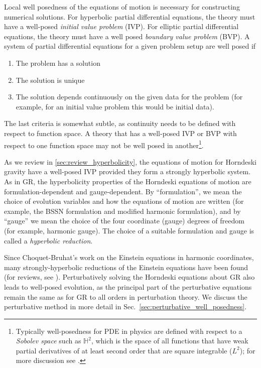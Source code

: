 \documentclass{ws-ijmpd}
\begin{document}
Local well posedness of the equations of motion is necessary for
constructing numerical solutions.
For hyperbolic partial differential equations,
the theory must have a well-posed \emph{initial value problem} (IVP).
For elliptic partial differential equations, the theory must
have a well posed \emph{boundary value problem} (BVP).
A system of partial differential equations for a given problem setup
are well posed if\cite{evans2010partial}
\begin{enumerate}
\item The problem has a solution 
\item The solution is unique
\item The solution depends continuously on the
   given data for the problem (for example, for an initial value problem
      this would be initial data).
\end{enumerate}
   The last criteria is somewhat subtle, as continuity needs to be 
defined with respect to function space.
A theory that has a well-posed IVP or BVP with respect
to one function space may not be well posed in another\footnote{Typically 
well-posedness for PDE in physics are defined with respect to
a \emph{Sobolev space} such as $\mathbb{H}^2$,
which is the space of all
functions that have weak partial derivatives
of at least second order that are square integrable ($L^2$); 
for more discussion see 
.}.

As we review in \ref{sec:review_hyperbolicity}, the equations of motion
for Horndeski gravity have a well-posed IVP provided they form
a strongly hyperbolic system.
As in GR\cite{christodoulou2008mathematical,Sarbach:2012pr,Reula_review}, 
the hyperbolicity properties of the Horndeski equations
of motion are formulation-dependent and gauge-dependent.
By ``formulation'', we mean the choice of evolution variables 
and how the equations of motion are written
(for example, the BSSN formulation\cite{Shibata:1995we,Baumgarte:1998te} 
and modified harmonic 
formulation\cite{Friedrich:1996hq,Garfinkle:2001ni,Pretorius:2006tp}),
and by ``gauge'' we mean the choice
of the four coordinate (gauge) degrees of freedom
(for example, harmonic gauge\cite{choquet_bruhat_harmonic}).
The choice of a suitable formulation and gauge is called a
\emph{hyperbolic reduction}\cite{Friedrich:1996hq}.

Since Choquet-Bruhat's work on the Einstein equations in harmonic
coordinates\cite{choquet_bruhat_harmonic},
many strongly-hyperbolic reductions of the Einstein equations have
been found (for reviews, see ).
Perturbatively solving the Horndeski equations about
GR also leads to well-posed evolution, as the principal part of the
perturbative equations remain the same as for GR to all orders
in perturbation theory. We discuss the perturbative method
in more detail in Sec.~\ref{sec:perturbative_well_posedness}.
\end{document}
